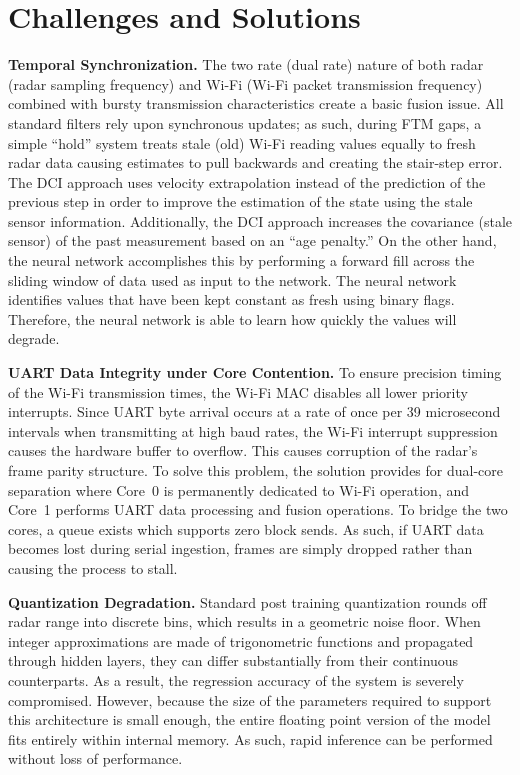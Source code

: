 \chapter{Challenges and Solutions}
\label{chap:challenges}

\textbf{Temporal Synchronization.} The two rate (dual rate) nature of both radar (radar sampling frequency) and Wi-Fi (Wi-Fi packet transmission frequency) combined with bursty transmission characteristics create a basic fusion issue. All standard filters rely upon synchronous updates; as such, during FTM gaps, a simple ``hold'' system treats stale (old) Wi-Fi reading values equally to fresh radar data causing estimates to pull backwards and creating the stair-step error. The DCI approach uses velocity extrapolation instead of the prediction of the previous step in order to improve the estimation of the state using the stale sensor information. Additionally, the DCI approach increases the covariance (stale sensor) of the past measurement based on an ``age penalty.'' On the other hand, the neural network accomplishes this by performing a forward fill across the sliding window of data used as input to the network. The neural network identifies values that have been kept constant as fresh using binary flags. Therefore, the neural network is able to learn how quickly the values will degrade.

\textbf{UART Data Integrity under Core Contention.} To ensure precision timing of the Wi-Fi transmission times, the Wi-Fi MAC disables all lower priority interrupts. Since UART byte arrival occurs at a rate of once per 39 microsecond intervals when transmitting at high baud rates, the Wi-Fi interrupt suppression causes the hardware buffer to overflow. This causes corruption of the radar's frame parity structure. To solve this problem, the solution provides for dual-core separation where Core~0 is permanently dedicated to Wi-Fi operation, and Core~1 performs UART data processing and fusion operations. To bridge the two cores, a queue exists which supports zero block sends. As such, if UART data becomes lost during serial ingestion, frames are simply dropped rather than causing the process to stall.

\textbf{Quantization Degradation.} Standard post training quantization rounds off radar range into discrete bins, which results in a geometric noise floor. When integer approximations are made of trigonometric functions and propagated through hidden layers, they can differ substantially from their continuous counterparts. As a result, the regression accuracy of the system is severely compromised. However, because the size of the parameters required to support this architecture is small enough, the entire floating point version of the model fits entirely within internal memory. As such, rapid inference can be performed without loss of performance.

